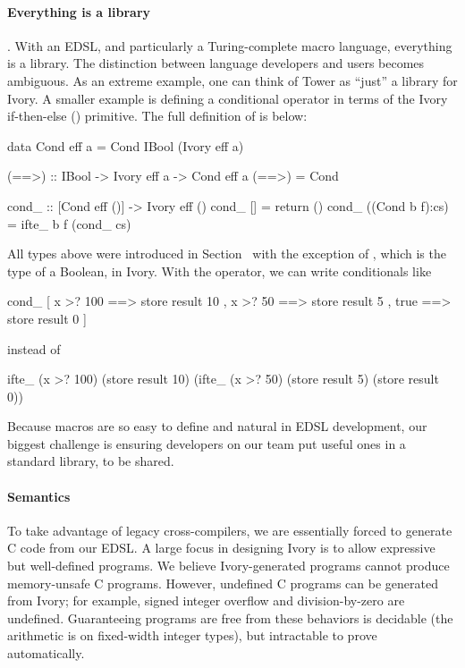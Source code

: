 \paragraph{Everything is a library}.  With an EDSL, and particularly a
    Turing-complete macro language, everything is a library.  The distinction
    between language developers and users becomes ambiguous.  As an extreme
    example, one can think of Tower as ``just'' a library for Ivory.  A smaller
    example is defining a conditional operator in terms of the Ivory
    if-then-else () primitive.  The full definition of  is below:
    \begin{code}
data Cond eff a = Cond IBool (Ivory eff a)

(==>) :: IBool -> Ivory eff a -> Cond eff a
(==>) = Cond

cond_ :: [Cond eff ()] -> Ivory eff ()
cond_ [] = return ()
cond_ ((Cond b f):cs) = ifte_ b f (cond_ cs)
    \end{code}
\noindent
All types above were introduced in Section~\cite{sec:ivory} with the exception
of , which is the type of a Boolean, in Ivory.  With the 
operator, we can write conditionals like
\begin{code}
cond_ [ x >? 100 ==> store result 10
      , x >? 50  ==> store result 5
      , true     ==> store result 0 ]
\end{code}
\noindent
instead of
\begin{code}
 ifte_ (x >? 100)
   (store result 10)
   (ifte_ (x >? 50)
     (store result 5)
       (store result 0))
\end{code}

\noindent
Because macros are so easy to define and natural in EDSL development, our
biggest challenge is ensuring developers on our team put useful ones in a
standard library, to be shared.


\paragraph{Semantics}
To take advantage of legacy cross-compilers, we are essentially forced to
generate C code from our EDSL.  A large focus in designing Ivory is to allow
expressive but well-defined programs.  We believe Ivory-generated programs
cannot produce memory-unsafe C programs.  However, undefined C programs can be
generated from Ivory; for example, signed integer overflow and division-by-zero
are undefined.  Guaranteeing programs are free from these behaviors is decidable
(the arithmetic is on fixed-width integer types), but intractable to prove
automatically.

